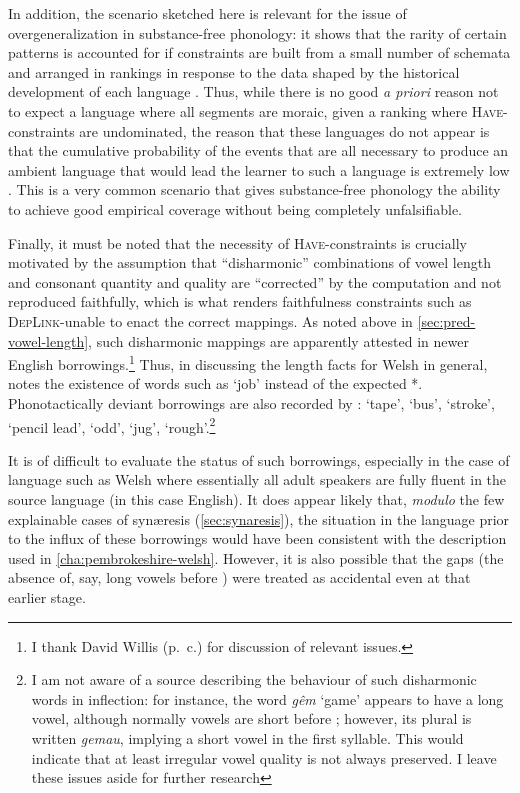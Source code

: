 In addition, the scenario sketched here is relevant for the issue of overgeneralization in substance\hyp free phonology: it shows that the rarity of certain patterns is accounted for if constraints are built from a small number of schemata and arranged in rankings in response to the data shaped by the historical development of each language \citep[\cfm][]{hale03:_neogr,hale07:_histor}. Thus, while there is no good \emph{a priori} reason not to expect a language where all segments are moraic, given a ranking where \textsc{Have}-\mo constraints are undominated, the reason that these languages do not appear is that the cumulative probability of the events that are all necessary to produce an ambient language that would lead the learner to such a language is extremely low \citep[\cfm][]{harris08}. This is a very common scenario that gives substance\hyp free phonology the ability to achieve good empirical coverage without being completely unfalsifiable.

Finally, it must be noted that the necessity of \textsc{Have}-\mo constraints is crucially motivated by the assumption that \enquote{disharmonic} combinations of vowel length and consonant quantity and quality are \enquote{corrected} by the computation and not reproduced faithfully, which is what renders faithfulness constraints such as \textsc{DepLink}-\mo unable to enact the correct mappings. As noted above in \cref{sec:pred-vowel-length}, such disharmonic mappings are apparently attested in newer English borrowings.\footnote{I thank David Willis (p.~c.) for discussion of relevant issues.} Thus, in discussing the length facts for Welsh in general, \citet{wells79:_final_welsh} notes the existence of words such as \ipa{[ˈdʒɔb]} `job' instead of the expected *\ipa{[ˈdʒɔːb]}. Phonotactically deviant borrowings are also recorded by \citet[\emph{sub vocibus}]{thomas00:_welsh}: \ipa{[ˈteːp]} `tape', \ipa{[ˈbus]} `bus', \ipa{[ˈstroːk]} `stroke', \ipa{[ˈled]} `pencil lead', \ipa{[ˈod]} `odd', \ipa{[ˈdʒuɡ]} `jug', \ipa{[ˈruf]} `rough'.\footnote{I am not aware of a source describing the behaviour of such disharmonic words in inflection: for instance, the word \emph{gêm} `game' appears to have a long vowel, although normally vowels are short before \ipa{[m]}; however, its plural is written \emph{gemau}, implying a short vowel in the first syllable. This would indicate that at least irregular vowel quality is not always preserved. I leave these issues aside for further research}

It is of difficult to evaluate the status of such borrowings, especially in the case of language such as Welsh where essentially all adult speakers are fully fluent in the source language (in this case English). It does appear likely that, \emph{modulo} the few explainable cases of synæresis (\cref{sec:synaresis}), the situation in the language prior to the influx of these borrowings would have been consistent with the description used in \cref{cha:pembrokeshire-welsh}. However, it is also possible that the gaps (\ie the absence of, say, long vowels before \ipa{[p~t~k]}) were treated as accidental even at that earlier stage.

